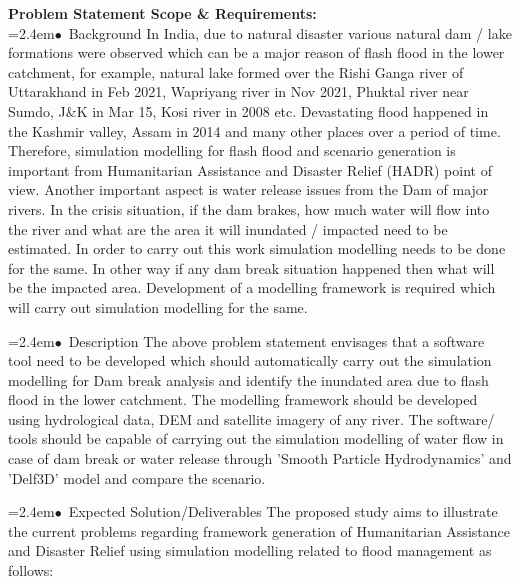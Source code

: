\documentclass[10pt,a4paper]{article}
\begin{document}
\begin{tcolorbox}[pscard, title={"\textbf{SIH26161} \quad $\vert$ \quad Dam Break Inundation Modelling Using Hydrodynamic Modelling of any River}]
\textbf{\color{sihnavy}Problem Statement Scope \& Requirements:}\\[0.15cm]
\noindent\hspace*{1.2em}\hangindent=2.4em\textcolor{sihblue}{$\bullet$}~\small Background In India, due to natural disaster various natural dam / lake formations were observed which can be a major reason of flash flood in the lower catchment, for example, natural lake formed over the Rishi Ganga river of Uttarakhand in Feb 2021, Wapriyang river in Nov 2021, Phuktal river near Sumdo, J\&K in Mar 15, Kosi river in 2008 etc. Devastating flood happened in the Kashmir valley, Assam in 2014 and many other places over a period of time. Therefore, simulation modelling for flash flood and scenario generation is important from Humanitarian Assistance and Disaster Relief (HADR) point of view. Another important aspect is water release issues from the Dam of major rivers. In the crisis situation, if the dam brakes, how much water will flow into the river and what are the area it will inundated / impacted need to be estimated. In order to carry out this work simulation modelling needs to be done for the same. In other way if any dam break situation happened then what will be the impacted area. Development of a modelling framework is required which will carry out simulation modelling for the same.\par\vspace{0.05cm}
\noindent\hspace*{1.2em}\hangindent=2.4em\textcolor{sihblue}{$\bullet$}~\small Description The above problem statement envisages that a software tool need to be developed which should automatically carry out the simulation modelling for Dam break analysis and identify the inundated area due to flash flood in the lower catchment. The modelling framework should be developed using hydrological data, DEM and satellite imagery of any river. The software/ tools should be capable of carrying out the simulation modelling of water flow in case of dam break or water release through 'Smooth Particle Hydrodynamics' and 'Delf3D' model and compare the scenario.\par\vspace{0.05cm}
\noindent\hspace*{1.2em}\hangindent=2.4em\textcolor{sihblue}{$\bullet$}~\small Expected Solution/Deliverables The proposed study aims to illustrate the current problems regarding framework generation of Humanitarian Assistance and Disaster Relief using simulation modelling related to flood management as follows:\par\vspace{0.05cm}

\end{tcolorbox}
\end{document}
